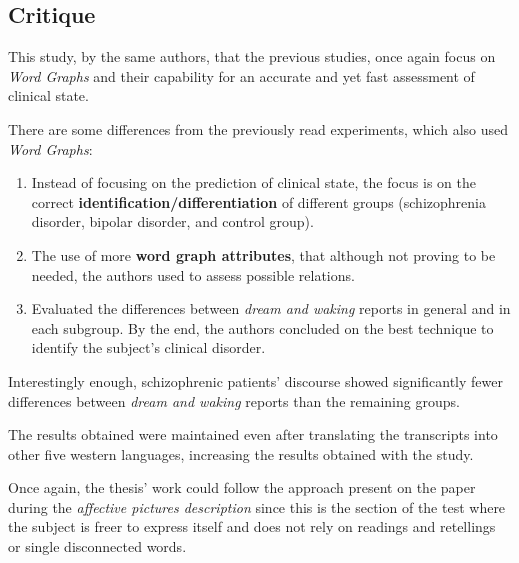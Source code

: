 \documentclass{Paper_Summary}
\begin{document}
\makepapertitle

\breakline

\begin{center}
    \section*{Critique}
\end{center}

    This study, by the same authors, that the previous studies, once again focus on \emph{Word Graphs} and their capability for an accurate and yet fast assessment of clinical state.

    There are some differences from the previously read experiments, which also used \emph{Word Graphs}:
    \begin{enumerate}
        \item Instead of focusing on the prediction of clinical state, the focus is on the correct \textbf{identification/differentiation} of different groups (schizophrenia disorder, bipolar disorder, and control group).
        \item The use of more \textbf{word graph attributes}, that although not proving to be needed, the authors used to assess possible relations.
        \item Evaluated the differences between \emph{dream and waking} reports in general and in each subgroup. By the end, the authors concluded on the best technique to identify the subject's clinical disorder.
    \end{enumerate}

    Interestingly enough, schizophrenic patients' discourse showed significantly fewer differences between \emph{dream and waking} reports than the remaining groups.

    The results obtained were maintained even after translating the transcripts into other five western languages, increasing the results obtained with the study.

    Once again, the thesis' work could follow the approach present on the paper during the \emph{affective pictures description} since this is the section of the test where the subject is freer to express itself and does not rely on readings and retellings or single disconnected words.

\breakline
\end{document}
